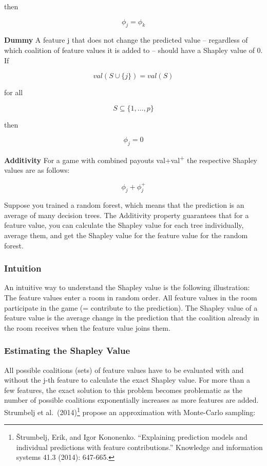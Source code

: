 \documentclass[
  11pt,
]{scrbook}
\begin{document}
then

\[\phi_j=\phi_{k}\]

\textbf{Dummy}
A feature j that does not change the predicted value -- regardless of which coalition of feature values it is added to -- should have a Shapley value of 0.
If

\[val(S\cup\{j\})=val(S)\]

for all

\[S\subseteq\{1,\ldots,p\}\]

then

\[\phi_j=0\]

\textbf{Additivity}
For a game with combined payouts val+val\textsuperscript{+} the respective Shapley values are as follows:

\[\phi_j+\phi_j^{+}\]

Suppose you trained a random forest, which means that the prediction is an average of many decision trees.
The Additivity property guarantees that for a feature value, you can calculate the Shapley value for each tree individually, average them, and get the Shapley value for the feature value for the random forest.

\hypertarget{intuition}{%
\subsubsection{Intuition}\label{intuition}}

An intuitive way to understand the Shapley value is the following illustration:
The feature values enter a room in random order.
All feature values in the room participate in the game (= contribute to the prediction).
The Shapley value of a feature value is the average change in the prediction that the coalition already in the room receives when the feature value joins them.

\hypertarget{estimating-the-shapley-value}{%
\subsubsection{Estimating the Shapley Value}\label{estimating-the-shapley-value}}

All possible coalitions (sets) of feature values have to be evaluated with and without the j-th feature to calculate the exact Shapley value.
For more than a few features, the exact solution to this problem becomes problematic as the number of possible coalitions exponentially increases as more features are added.
Strumbelj et al.~(2014)\footnote{Štrumbelj, Erik, and Igor Kononenko. ``Explaining prediction models and individual predictions with feature contributions.'' Knowledge and information systems 41.3 (2014): 647-665.} propose an approximation with Monte-Carlo sampling:
\end{document}
